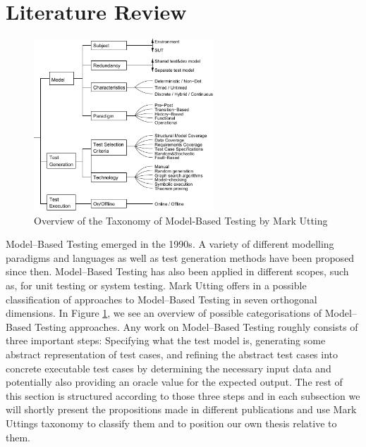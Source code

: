 \section{Literature Review}
\label{sec:RelatedWork}
\begin{figure}
\begin{center}
\includegraphics[width=0.6\textwidth]{./pics/taxonomyOfMBT.pdf}
\end{center}
\caption{Overview of the Taxonomy of Model-Based Testing by Mark Utting \cite{utting2006taxonomy}}
\label{fig:UttingTaxonomy}
\end{figure}
Model--Based Testing emerged in the 1990s. A variety of different modelling paradigms and languages as well as test generation methods have been proposed since then. Model--Based Testing has also been applied in different scopes, such as, for unit testing or system testing. Mark Utting offers in \cite{utting2006taxonomy} a possible classification of approaches to Model--Based Testing in seven orthogonal dimensions. In Figure \ref{fig:UttingTaxonomy}, we see an overview of possible categorisations of Model--Based Testing approaches. Any work on Model--Based Testing roughly consists of three important steps: Specifying what the test model is, generating some abstract representation of test cases, and refining the abstract test cases into concrete executable test cases by determining the necessary input data and potentially also providing an oracle value for the expected output. The rest of this section is structured according to those three steps and in each subsection we will shortly present the propositions made in different publications and use Mark Uttings taxonomy to classify them and to position our own thesis relative to them.
% 
